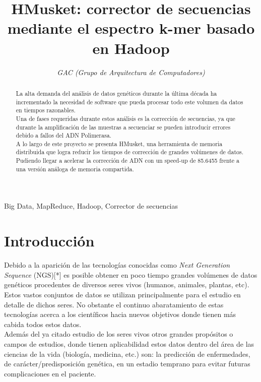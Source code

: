 \documentclass[conference]{IEEEtran}
\begin{document}
\title{HMusket: corrector de secuencias mediante el espectro k-mer basado en Hadoop}

\author{
	\textit{GAC (Grupo de Arquitectura de Computadores)}\\
}

\maketitle

\begin{abstract}
La alta demanda del análisis de datos genéticos durante la última década ha incrementado la necesidad de software que pueda procesar todo este volumen da datos en tiempos razonables.\\
Una de fases requeridas durante estos análisis es la corrección de secuencias, ya que durante la amplificación de las muestras a secuenciar se pueden introducir errores debido a fallos del ADN Polimerasa.\\
A lo largo de este proyecto se presenta HMusket, una herramienta de memoria distribuida que logra reducir los tiempos de corrección de grandes volúmenes de datos. Pudiendo llegar a acelerar la corrección de ADN con un speed-up de 85.6455 frente a una versión análoga de memoria compartida.
\end{abstract}

\begin{IEEEkeywords}
Big Data, MapReduce, Hadoop, Corrector de secuencias
\end{IEEEkeywords}

\section{Introducción}
Debido a la aparición de las tecnologías conocidas como \textit{Next Generation Sequence} (NGS)[*] es posible obtener en poco tiempo grandes volúmenes de datos genéticos procedentes de diversos seres vivos (humanos, animales, plantas, etc). Estos vastos conjuntos de datos se utilizan principalmente para el estudio en detalle de dichos seres. 
No obstante el continuo abaratamiento de estas tecnologías acerca a los científicos hacia nuevos objetivos donde tienen más cabida todos estos datos.\\
Además del ya citado estudio de los seres vivos otros grandes propósitos o campos de estudios, donde tienen aplicabilidad estos datos dentro del área de las ciencias de la vida (biología, medicina, etc.) son: la predicción de enfermedades, de carácter/predisposición genética, en un estadio temprano para evitar futuras complicaciones en el paciente. \\
\end{document}
